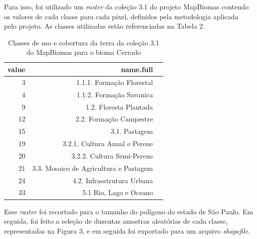 	Para isso, foi utilizado um \textit{raster} da coleção 3.1 do projeto MapBiomas \cite{mapbiomas2018coleccao} contendo os valores de cada classe para cada pixel, definidos pela metodologia aplicada pelo projeto. As classes utilizadas estão referenciadas na Tabela 2.

\begin{table}[H]
\label{tab-classes}
\centering
\caption{Classes de uso e cobertura da terra da coleção 3.1 do MapBiomas para o bioma Cerrado}
\begin{tabular}{rrl}
  \hline
 value & name.full \\ 
  \hline
 3 &         1.1.1. Formação Florestal \\ 
4 &         1.1.2. Formação Savanica \\ 
   9 &     1.2. Floresta Plantada \\ 
  12 &     2.2. Formação Campestre \\ 
  15 &     3.1. Pastagem \\ 
  19 &          3.2.1. Cultura Anual e Perene \\ 
  20 &          3.2.2. Cultura Semi-Perene \\ 
  21 &     3.3. Mosaico de Agricultura e Pastagem \\ 
  24 &     4.2. Infraestrutura Urbana \\ 
  33 &     5.1 Rio, Lago e Oceano \\ 
   \hline
\end{tabular}
\end{table}

    Esse \emph{raster} foi recortado para o tamanho do polígono do estado
de São Paulo. Em seguida, foi feito a seleção de duzentas amostras aleatórias
de cada classe, representadas na Figura 3, e em seguida foi exportado para um arquivo \emph{shapefile}.

